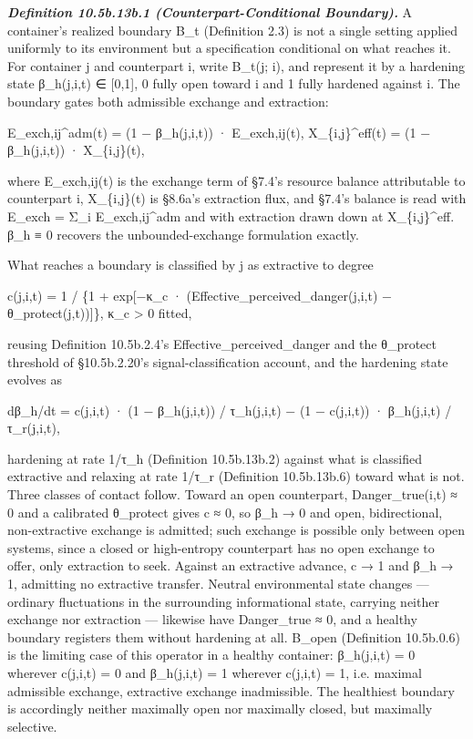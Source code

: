 \documentclass[
]{article}
\begin{document}
\emph{\textbf{Definition 10.5b.13b.1 (Counterpart-Conditional
Boundary).}} A container's realized boundary B\_t (Definition 2.3) is not
a single setting applied uniformly to its environment but a specification
conditional on what reaches it. For container j and counterpart i, write
B\_t(j; i), and represent it by a hardening state β\_h(j,i,t) ∈ {[}0,1{]},
0 fully open toward i and 1 fully hardened against i. The boundary gates
both admissible exchange and extraction:

E\_exch,ij\^{}adm(t) = (1 − β\_h(j,i,t)) · E\_exch,ij(t),
X\_\{i,j\}\^{}eff(t) = (1 − β\_h(j,i,t)) · X\_\{i,j\}(t),

where E\_exch,ij(t) is the exchange term of §7.4's resource balance
attributable to counterpart i, X\_\{i,j\}(t) is §8.6a's extraction flux,
and §7.4's balance is read with E\_exch = Σ\_i E\_exch,ij\^{}adm and with
extraction drawn down at X\_\{i,j\}\^{}eff. β\_h ≡ 0 recovers the
unbounded-exchange formulation exactly.

What reaches a boundary is classified by j as extractive to degree

c(j,i,t) = 1 / \{1 + exp{[}−κ\_c · (Effective\_perceived\_danger(j,i,t) −
θ\_protect(j,t)){]}\}, κ\_c \textgreater{} 0 fitted,

reusing Definition 10.5b.2.4's Effective\_perceived\_danger and the
θ\_protect threshold of §10.5b.2.20's signal-classification account, and
the hardening state evolves as

dβ\_h/dt = c(j,i,t) · (1 − β\_h(j,i,t)) / τ\_h(j,i,t) − (1 − c(j,i,t))
· β\_h(j,i,t) / τ\_r(j,i,t),

hardening at rate 1/τ\_h (Definition 10.5b.13b.2) against what is
classified extractive and relaxing at rate 1/τ\_r (Definition
10.5b.13b.6) toward what is not. Three classes of contact follow. Toward
an open counterpart, Danger\_true(i,t) ≈ 0 and a calibrated θ\_protect
gives c ≈ 0, so β\_h → 0 and open, bidirectional, non-extractive exchange
is admitted; such exchange is possible only between open systems, since
a closed or high-entropy counterpart has no open exchange to offer, only
extraction to seek. Against an extractive advance, c → 1 and β\_h → 1,
admitting no extractive transfer. Neutral environmental state changes
--- ordinary fluctuations in the surrounding informational state,
carrying neither exchange nor extraction --- likewise have
Danger\_true ≈ 0, and a healthy boundary registers them without hardening
at all. B\_open (Definition 10.5b.0.6) is the limiting case of this
operator in a healthy container: β\_h(j,i,t) = 0 wherever c(j,i,t) = 0 and
β\_h(j,i,t) = 1 wherever c(j,i,t) = 1, i.e. maximal admissible exchange,
extractive exchange inadmissible. The healthiest boundary is accordingly
neither maximally open nor maximally closed, but maximally selective.
\end{document}
